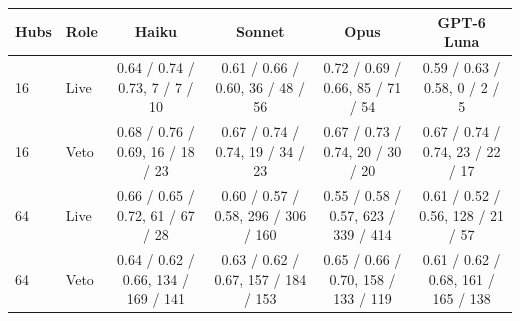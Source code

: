 \begin{tabular}{llcccc}
\toprule
Hubs & Role & Haiku & Sonnet & Opus & GPT-6 Luna \\
\midrule
16 & Live & 0.64 / 0.74 / 0.73, 7 / 7 / 10 & 0.61 / 0.66 / 0.60, 36 / 48 / 56 & 0.72 / 0.69 / 0.66, 85 / 71 / 54 & 0.59 / 0.63 / 0.58, 0 / 2 / 5 \\
16 & Veto & 0.68 / 0.76 / 0.69, 16 / 18 / 23 & 0.67 / 0.74 / 0.74, 19 / 34 / 23 & 0.67 / 0.73 / 0.74, 20 / 30 / 20 & 0.67 / 0.74 / 0.74, 23 / 22 / 17 \\
64 & Live & 0.66 / 0.65 / 0.72, 61 / 67 / 28 & 0.60 / 0.57 / 0.58, 296 / 306 / 160 & 0.55 / 0.58 / 0.57, 623 / 339 / 414 & 0.61 / 0.52 / 0.56, 128 / 21 / 57 \\
64 & Veto & 0.64 / 0.62 / 0.66, 134 / 169 / 141 & 0.63 / 0.62 / 0.67, 157 / 184 / 153 & 0.65 / 0.66 / 0.70, 158 / 133 / 119 & 0.61 / 0.62 / 0.68, 161 / 165 / 138 \\
\bottomrule
\end{tabular}
